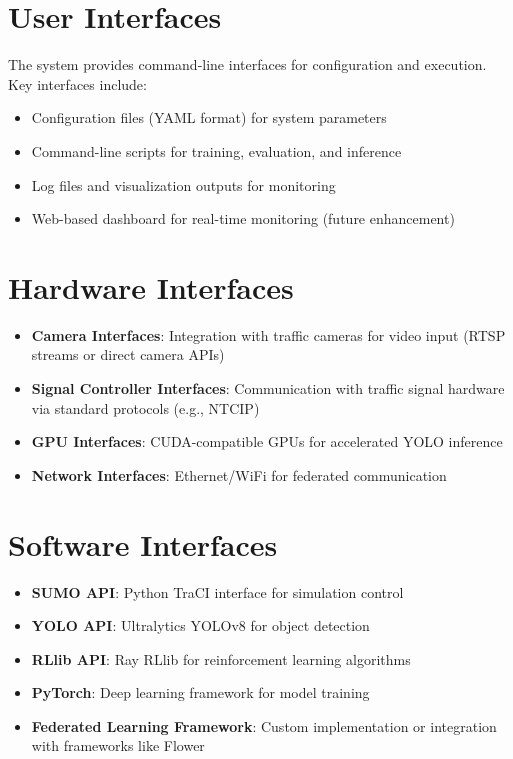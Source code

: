 \section{User Interfaces}

The system provides command-line interfaces for configuration and execution. Key interfaces include:
\begin{itemize}
\item Configuration files (YAML format) for system parameters
\item Command-line scripts for training, evaluation, and inference
\item Log files and visualization outputs for monitoring
\item [TBD] Web-based dashboard for real-time monitoring (future enhancement)
\end{itemize}

\section{Hardware Interfaces}

\begin{itemize}
\item \textbf{Camera Interfaces}: Integration with traffic cameras for video input (RTSP streams or direct camera APIs)
\item \textbf{Signal Controller Interfaces}: Communication with traffic signal hardware via standard protocols (e.g., NTCIP)
\item \textbf{GPU Interfaces}: CUDA-compatible GPUs for accelerated YOLO inference
\item \textbf{Network Interfaces}: Ethernet/WiFi for federated communication
\end{itemize}

\section{Software Interfaces}

\begin{itemize}
\item \textbf{SUMO API}: Python TraCI interface for simulation control
\item \textbf{YOLO API}: Ultralytics YOLOv8 for object detection
\item \textbf{RLlib API}: Ray RLlib for reinforcement learning algorithms
\item \textbf{PyTorch}: Deep learning framework for model training
\item \textbf{Federated Learning Framework}: Custom implementation or integration with frameworks like Flower
\end{itemize}


